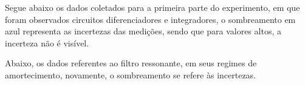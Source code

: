 Segue abaixo os dados coletados para a primeira parte do experimento, em que foram observados circuitos diferenciadores e integradores, o sombreamento em azul representa as incertezas das medições, sendo que para valores altos, a incerteza não é visível. 




Abaixo, os dados referentes ao filtro ressonante, em seus regimes de amortecimento, novamente, o sombreamento se refere às incertezas.


\pagebreak